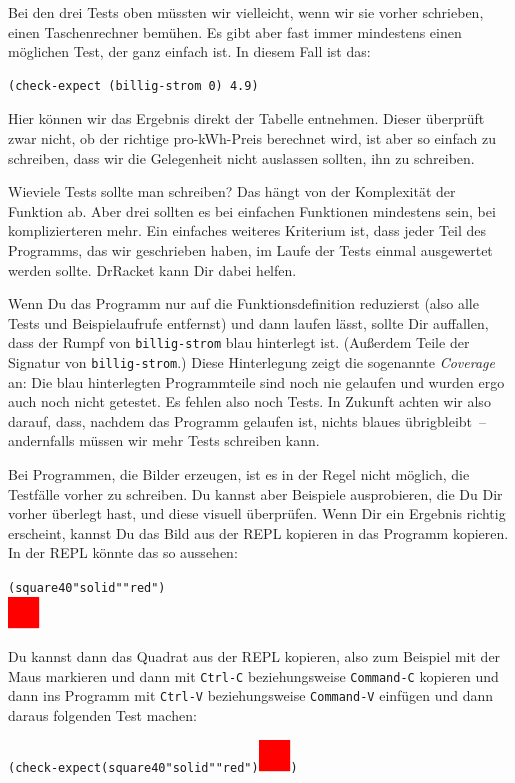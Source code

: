 Bei den drei Tests oben müssten wir vielleicht, wenn wir sie vorher
schrieben, einen Taschenrechner bemühen.  Es gibt aber fast immer
mindestens einen möglichen Test, der ganz einfach ist.  In diesem Fall
ist das:
%
\begin{verbatim}
(check-expect (billig-strom 0) 4.9)
\end{verbatim}
%
Hier können wir das Ergebnis direkt der Tabelle entnehmen.  Dieser
überprüft zwar nicht, ob der richtige pro-kWh-Preis berechnet wird,
ist aber so einfach zu schreiben, dass wir die Gelegenheit nicht
auslassen sollten, ihn zu schreiben.

Wieviele Tests sollte man schreiben?  Das hängt von der Komplexität
der Funktion ab.  Aber drei sollten es bei einfachen Funktionen
mindestens sein, bei komplizierteren mehr.  Ein einfaches weiteres
Kriterium ist, dass jeder Teil des Programms, das wir geschrieben
haben, im Laufe der Tests einmal ausgewertet werden sollte.  DrRacket
kann Dir dabei helfen.

Wenn Du das Programm nur auf die Funktionsdefinition reduzierst (also
alle Tests und Beispielaufrufe entfernst) und dann laufen lässt,
sollte Dir auffallen, dass der Rumpf von \texttt{billig-strom} blau
hinterlegt ist.  (Außerdem Teile der Signatur von
\texttt{billig-strom}.)  Diese Hinterlegung zeigt die sogenannte
\textit{Coverage} an: Die blau hinterlegten
Programmteile sind noch nie gelaufen und wurden ergo auch noch nicht
getestet.  Es fehlen also noch Tests.  In Zukunft achten wir also
darauf, dass, nachdem das Programm gelaufen ist, nichts blaues
übrigbleibt~-- andernfalls müssen wir mehr Tests schreiben kann.

Bei Programmen, die Bilder erzeugen, ist es in der Regel nicht
möglich, die Testfälle vorher zu schreiben.  Du kannst aber Beispiele
ausprobieren, die Du Dir vorher überlegt hast, und diese visuell überprüfen.
Wenn Dir ein Ergebnis richtig erscheint, kannst Du das Bild aus der
REPL kopieren in das Programm kopieren.  In der REPL könnte das so aussehen:
%
\begin{alltt}
(square 40 "solid" "red")
\evalsto{} \includegraphics[height=24pt]{i1prog/square}
\end{alltt}
%
Du kannst dann das Quadrat aus der REPL kopieren, also zum Beispiel
mit der Maus markieren und dann mit \texttt{Ctrl-C} beziehungsweise
\texttt{Command-C} kopieren und dann ins Programm mit \texttt{Ctrl-V}
beziehungsweise \texttt{Command-V} einfügen und dann daraus folgenden
Test machen:
%
\begin{alltt}
(check-expect (square 40 "solid" "red") \includegraphics[height=24pt]{i1prog/square})
\end{alltt}

